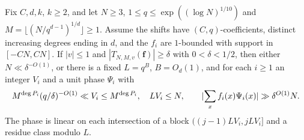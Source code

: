 \begin{lemma}\label{p:localinverse}
\leanok
{}
Fix $C,d,k$, $k\ge2$, and let $N\ge3$,
$1\le q\le\exp((\log N)^{1/10})$ and
$M=\lfloor(N/q^{d-1})^{1/d}\rfloor\ge1$. Assume the shifts
have $(C,q)$-coefficients, distinct increasing degrees ending in $d$,
and the $f_i$ are $1$-bounded with support in $[-CN,CN]$.
If $|v|\le1$ and $|T_{N,M,v}(\mathbf f)|\ge\delta$ with
$0<\delta<1/2$, then either $N\ll\delta^{-O(1)}$, or there is a fixed
$L=q^B$, $B=O_d(1)$, and for each $i\ge1$ an integer $V_i$
and a unit phase $\Psi_i$ with
\[
 M^{\deg P_i}(q/\delta)^{-O(1)}\ll V_i\le M^{\deg P_i},\quad
 LV_i\le N,\qquad
 \lvert\sum_x f_i(x)\Psi_i(x)\rvert\gg\delta^{O(1)}N.
\]
The phase is linear on each intersection of a block
$((j-1)LV_i,jLV_i]$ and a residue class modulo $L$.
\end{lemma}
